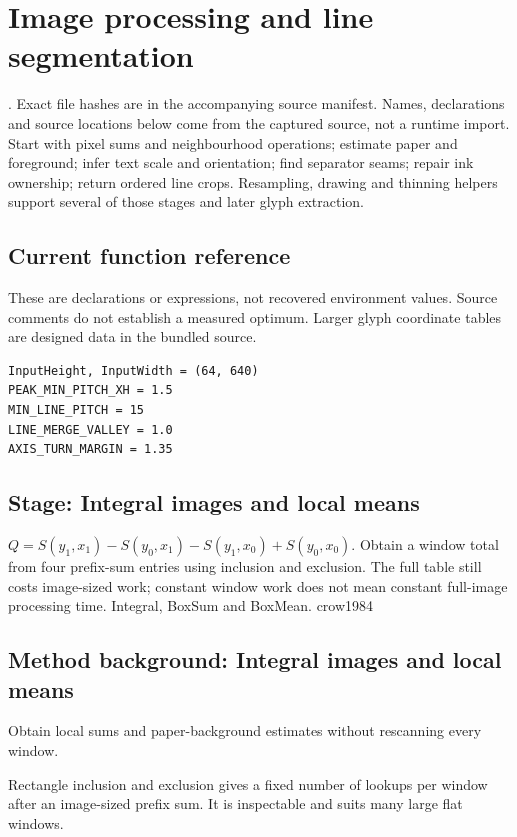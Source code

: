 \chapter{Image processing and line segmentation}\label{module:segment}
. Exact file hashes are in the accompanying source manifest. Names, declarations and source locations below come from the captured source, not a runtime import.
Start with pixel sums and neighbourhood operations; estimate paper and foreground; infer text scale and orientation; find separator seams; repair ink ownership; return ordered line crops. Resampling, drawing and thinning helpers support several of those stages and later glyph extraction.



\section*{Current function reference}
These are declarations or expressions, not recovered environment values. Source comments do not establish a measured optimum. Larger glyph coordinate tables are designed data in the bundled source.
\begin{lstlisting}[style=plain]
InputHeight, InputWidth = (64, 640)
PEAK_MIN_PITCH_XH = 1.5
MIN_LINE_PITCH = 15
LINE_MERGE_VALLEY = 1.0
AXIS_TURN_MARGIN = 1.35
\end{lstlisting}
\section*{Stage: Integral images and local means}
{$Q=S(y_1,x_1)-S(y_0,x_1)-S(y_1,x_0)+S(y_0,x_0)$.}
{Obtain a window total from four prefix-sum entries using inclusion and
exclusion. The full table still costs image-sized work; constant window work
does not mean constant full-image processing time.}
{Integral, BoxSum and BoxMean.}
{crow1984}


\section{Method background: Integral images and local means}\label{method:integral}
Obtain local sums and paper-background estimates without rescanning every window.


Rectangle inclusion and exclusion gives a fixed number of lookups per window after an image-sized prefix sum. It is inspectable and suits many large flat windows.


